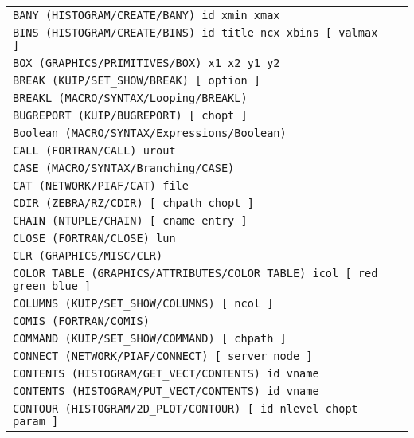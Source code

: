 \begin{longtable}{|>{\footnotesize\tt}lr|}
BANY (HISTOGRAM/CREATE/BANY)  id xmin xmax & \pageref{ref:HISTOGRAM/CREATE/BANY}\\ 
BINS (HISTOGRAM/CREATE/BINS)  id title ncx xbins [ valmax ] & \pageref{ref:HISTOGRAM/CREATE/BINS}\\ 
BOX (GRAPHICS/PRIMITIVES/BOX)  x1 x2 y1 y2 & \pageref{ref:GRAPHICS/PRIMITIVES/BOX}\\ 
BREAK (KUIP/SET_SHOW/BREAK)  [ option ] & \pageref{ref:KUIP/SET_SHOW/BREAK}\\ 
BREAKL (MACRO/SYNTAX/Looping/BREAKL)  & \pageref{ref:MACRO/SYNTAX/Looping/BREAKL}\\ 
BUGREPORT (KUIP/BUGREPORT)  [ chopt ] & \pageref{ref:KUIP/BUGREPORT}\\ 
Boolean (MACRO/SYNTAX/Expressions/Boolean)  & \pageref{ref:MACRO/SYNTAX/Expressions/Boolean}\\ 
CALL (FORTRAN/CALL)  urout & \pageref{ref:FORTRAN/CALL}\\ 
CASE (MACRO/SYNTAX/Branching/CASE)  & \pageref{ref:MACRO/SYNTAX/Branching/CASE}\\ 
CAT (NETWORK/PIAF/CAT)  file & \pageref{ref:NETWORK/PIAF/CAT}\\ 
CDIR (ZEBRA/RZ/CDIR)  [ chpath chopt ] & \pageref{ref:ZEBRA/RZ/CDIR}\\ 
CHAIN (NTUPLE/CHAIN)  [ cname entry ] & \pageref{ref:NTUPLE/CHAIN}\\ 
CLOSE (FORTRAN/CLOSE)  lun & \pageref{ref:FORTRAN/CLOSE}\\ 
CLR (GRAPHICS/MISC/CLR)  & \pageref{ref:GRAPHICS/MISC/CLR}\\ 
COLOR_TABLE (GRAPHICS/ATTRIBUTES/COLOR_TABLE)  icol [ red green blue ] & \pageref{ref:GRAPHICS/ATTRIBUTES/COLOR_TABLE}\\ 
COLUMNS (KUIP/SET_SHOW/COLUMNS)  [ ncol ] & \pageref{ref:KUIP/SET_SHOW/COLUMNS}\\ 
COMIS (FORTRAN/COMIS)  & \pageref{ref:FORTRAN/COMIS}\\ 
COMMAND (KUIP/SET_SHOW/COMMAND)  [ chpath ] & \pageref{ref:KUIP/SET_SHOW/COMMAND}\\ 
CONNECT (NETWORK/PIAF/CONNECT)  [ server node ] & \pageref{ref:NETWORK/PIAF/CONNECT}\\ 
CONTENTS (HISTOGRAM/GET_VECT/CONTENTS)  id vname & \pageref{ref:HISTOGRAM/GET_VECT/CONTENTS}\\ 
CONTENTS (HISTOGRAM/PUT_VECT/CONTENTS)  id vname & \pageref{ref:HISTOGRAM/PUT_VECT/CONTENTS}\\ 
CONTOUR (HISTOGRAM/2D_PLOT/CONTOUR)  [ id nlevel chopt param ] & \pageref{ref:HISTOGRAM/2D_PLOT/CONTOUR}\\ 

\end{longtable}
